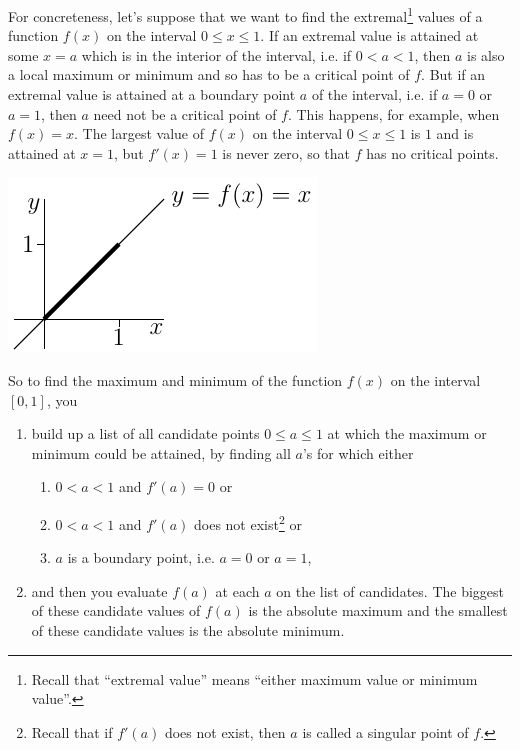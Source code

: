 For concreteness, let's suppose that we
want to find the extremal\footnote{Recall that ``extremal value''
means ``either maximum value or minimum value''.} values of a function 
$f(x)$ on the interval $0\le x\le 1$. If an extremal value is attained 
at some $x=a$ which is in the interior of the interval, i.e. if $0<a<1$, 
then $a$ is also a local maximum or minimum and so has to be a critical 
point of $f$. But if 
an extremal value is attained at a boundary point $a$ of the interval, 
i.e. if $a=0$ or $a=1$, then $a$ need not be a critical point of $f$. 
This happens, for example, when $f(x)=x$. The largest value of $f(x)$ on 
the interval $0\le x\le 1$ is $1$ and is attained at $x=1$, but $f'(x)=1$ 
is never zero, so that $f$ has no critical points.
\begin{efig}
\begin{center}
  \includegraphics{absMaxMin}
\end{center}
\end{efig}
So to find the maximum and minimum of the function $f(x)$ on the interval
$[0,1]$, you
\begin{enumerate}
\item build up a list of all candidate points $0\le a\le 1$ at which 
the maximum or minimum could be attained, by finding all $a$'s for which
either
   \begin{enumerate}
   \item $0<a<1$ and $f'(a)=0$ or
   \item $0<a<1$ and $f'(a)$ does not exist\footnote{Recall that if $f'(a)$ does not exist, then $a$ is called a singular point of $f$.} or
   \item $a$ is a boundary point, i.e. $a=0$ or $a=1$,
   \end{enumerate}
\item and then you evaluate $f(a)$ at each $a$ on the list of candidates.
   The biggest of these candidate values of $f(a)$ is the absolute maximum and the
   smallest of these candidate values is the absolute minimum.
\end{enumerate}

